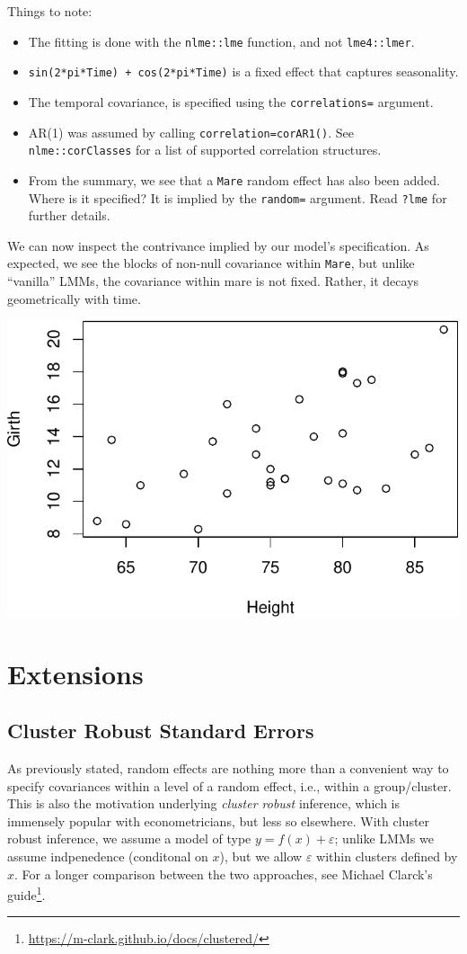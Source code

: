 \documentclass[]{book}
\providecommand{\tightlist}{%
  \setlength{\itemsep}{0pt}\setlength{\parskip}{0pt}}
\renewcommand{\href}[2]{#2\footnote{\url{#1}}}
\theoremstyle{definition}
\theoremstyle{definition}
\theoremstyle{definition}
\theoremstyle{remark}
\begin{document}
Things to note:

\begin{itemize}
\tightlist
\item
  The fitting is done with the \texttt{nlme::lme} function, and not \texttt{lme4::lmer}.
\item
  \texttt{sin(2*pi*Time)\ +\ cos(2*pi*Time)} is a fixed effect that captures seasonality.
\item
  The temporal covariance, is specified using the \texttt{correlations=} argument.
\item
  AR(1) was assumed by calling \texttt{correlation=corAR1()}. See \texttt{nlme::corClasses} for a list of supported correlation structures.
\item
  From the summary, we see that a \texttt{Mare} random effect has also been added. Where is it specified? It is implied by the \texttt{random=} argument. Read \texttt{?lme} for further details.
\end{itemize}

We can now inspect the contrivance implied by our model's specification.
As expected, we see the blocks of non-null covariance within \texttt{Mare}, but unlike ``vanilla'' LMMs, the covariance within mare is not fixed. Rather, it decays geometrically with time.

\includegraphics[width=0.5\linewidth]{Rcourse_files/figure-latex/unnamed-chunk-206-1}

\hypertarget{extensions-1}{%
\section{Extensions}\label{extensions-1}}

\hypertarget{cr-se}{%
\subsection{Cluster Robust Standard Errors}\label{cr-se}}

As previously stated, random effects are nothing more than a convenient way to specify covariances within a level of a random effect, i.e., within a group/cluster.
This is also the motivation underlying \emph{cluster robust} inference, which is immensely popular with econometricians, but less so elsewhere.
With cluster robust inference, we assume a model of type \(y=f(x)+\varepsilon\); unlike LMMs we assume indpenedence (conditonal on \(x\)), but we allow \(\varepsilon\) within clusters defined by \(x\).
For a longer comparison between the two approaches, see \href{https://m-clark.github.io/docs/clustered/}{Michael Clarck's guide}.
\end{document}
